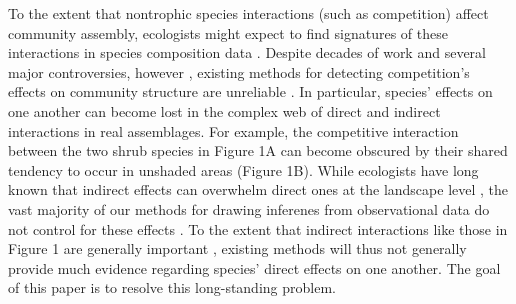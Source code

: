 To the extent that nontrophic species interactions (such as competition)
affect community assembly, ecologists might expect to find signatures of
these interactions in species composition data
\citep{macarthur_population_1958, diamond_island_1975}. Despite decades
of work and several major controversies, however
\citep{lewin_santa_1983, strong_ecological_1984, gotelli_swap_2003, connor_checkered_2013},
existing methods for detecting competition's effects on community
structure are unreliable \citep{gotelli_empirical_2009}. In particular,
species' effects on one another can become lost in the complex web of
direct and indirect interactions in real assemblages. For example, the
competitive interaction between the two shrub species in Figure 1A can
become obscured by their shared tendency to occur in unshaded areas
(Figure 1B). While ecologists have long known that indirect effects can
overwhelm direct ones at the landscape level
\citep{dodson_complementary_1970, levine_competitive_1976}, the vast
majority of our methods for drawing inferenes from observational data do
not control for these effects
\citep[e.g.][]{diamond_island_1975, strong_ecological_1984, gotelli_empirical_2009, veech_probabilistic_2013, pollock_understanding_2014}.
To the extent that indirect interactions like those in Figure 1 are
generally important \citep{dodson_complementary_1970}, existing methods
will thus not generally provide much evidence regarding species' direct
effects on one another. The goal of this paper is to resolve this
long-standing problem.

